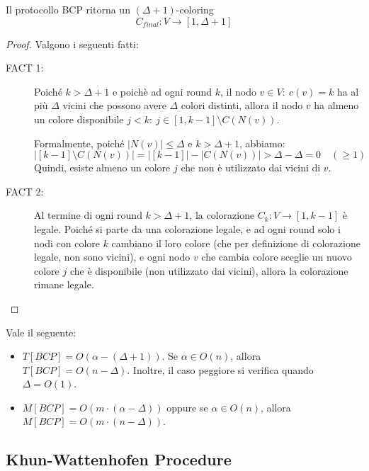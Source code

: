 \begin{teorema}[Correttezza]
    Il protocollo BCP ritorna un $(\Delta + 1)$-coloring
    \[
        C_{final}: V \to [1, \Delta + 1]
    \]
    \begin{proof}
        Valgono i seguenti fatti:
        \begin{description}
            \item[FACT 1:] Poiché $k > \Delta + 1$ e poichè ad ogni round $k$, il nodo $v \in V:\ c(v) = k$ ha al più $\Delta$ vicini che possono avere $\Delta$ colori distinti, allora il nodo $v$ ha almeno un colore disponibile $j < k:\ j \in [1, k-1] \setminus C(N(v))$.
            
            Formalmente, poiché $|N(v)| \leq \Delta$ e $k > \Delta + 1$, abbiamo:
            \[
                |[k-1] \setminus C(N(v))| = |[k-1]| - |C(N(v))| > \Delta - \Delta = 0 \quad (\geq 1)
            \]
            Quindi, esiste almeno un colore $j$ che non è utilizzato dai vicini di $v$.
            \item[FACT 2:] Al termine di ogni round $k > \Delta + 1$, la colorazione $C_k: V \to [1, k-1]$ è legale. Poiché si parte da una colorazione legale, e ad ogni round solo i nodi con colore $k$ cambiano il loro colore (che per definizione di colorazione legale, non sono vicini), e ogni nodo $v$ che cambia colore sceglie un nuovo colore $j$ che è disponibile (non utilizzato dai vicini), allora la colorazione rimane legale.
        \end{description}
    \end{proof}
\end{teorema}

\begin{teorema}
    Vale il seguente:
    \begin{itemize}
        \item $T[BCP] = O(\alpha - (\Delta + 1))$. Se $\alpha \in O(n)$, allora $T[BCP] = O(n - \Delta)$. Inoltre, il caso peggiore si verifica quando $\Delta = O(1)$.
        \item $M[BCP] = O(m \cdot (\alpha - \Delta))$ oppure se $\alpha \in O(n)$, allora $M[BCP] = O(m \cdot (n - \Delta))$.
    \end{itemize}
\end{teorema}

\subsection{Khun-Wattenhofen Procedure}


